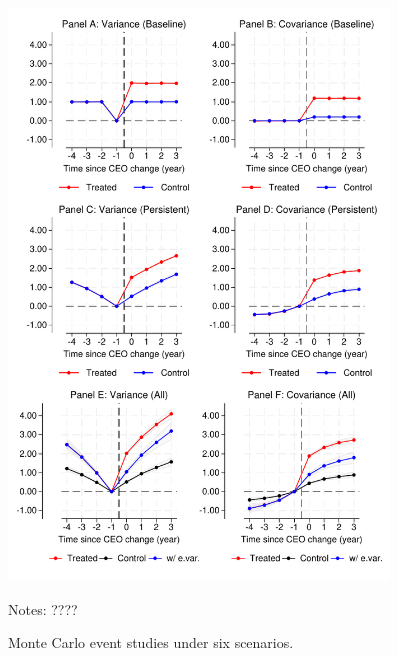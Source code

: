 \documentclass[11pt,a4paper]{article}
\begin{document}
\begin{figure}[htbp]
\centering
\includegraphics[width=0.9\textwidth]{figure/figuremc.pdf}
\caption{Monte Carlo event studies under six scenarios.} \label{fig:mc}
\vspace{.2cm}

\begin{minipage}{0.9\textwidth}
\footnotesize Notes: ????
\end{minipage}
\end{figure}
\end{document}
